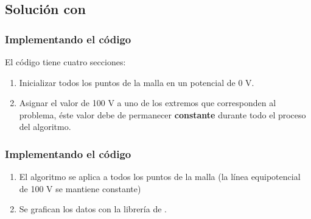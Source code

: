 \documentclass[12pt]{beamer}
\begin{document}
\subsection{Solución con \python}
\begin{frame}
\frametitle{Implementando el código}
El código tiene cuatro secciones:
\begin{enumerate}[<+->]
\item Inicializar todos los puntos de la malla en un potencial de 0 V.
\item Asignar el valor de 100 V a uno de los extremos que corresponden al problema, éste valor debe de permanecer \textbf{constante} durante todo el proceso del algoritmo.
\seti
\end{enumerate}
\end{frame}
\begin{frame}
\frametitle{Implementando el código}
\begin{enumerate}[<+->]
\conti
\item El algoritmo se aplica a todos los puntos de la malla (la línea equipotencial de 100 V se mantiene constante)
\item Se grafican los datos con la librería de .
\end{enumerate}
\end{frame}
\end{document}
